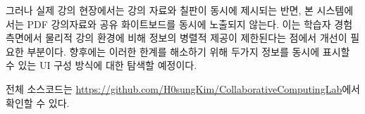 \documentclass[pdflatex,sn-mathphys-num]{sn-jnl}%
\theoremstyle{thmstyleone}%
\theoremstyle{thmstyletwo}%
\theoremstyle{thmstylethree}%
\begin{document}
그러나 실제 강의 현장에서는 강의 자료와 칠판이 동시에 제시되는 반면, 본 시스템에서는 PDF 강의자료와 공유 화이트보드를 동시에 노출되지 않는다. 이는 학습자 경험 측면에서 물리적 강의 환경에 비해 정보의 병렬적 제공이 제한된다는 점에서 개선이 필요한 부분이다. 향후에는 이러한 한계를 해소하기 위해 두가지 정보를 동시에 표시할 수 있는 UI 구성 방식에 대한 탐색할 예정이다.

전체 소스코드는 \href{https://github.com/H0sungKim/CollaborativeComputingLab}{https://github.com/H0sungKim/CollaborativeComputingLab}에서 확인할 수 있다.



\end{document}
